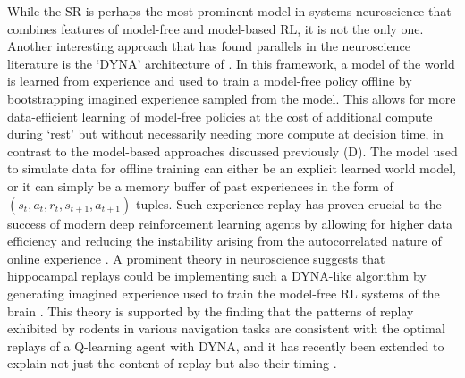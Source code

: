 While the SR is perhaps the most prominent model in systems neuroscience that combines features of model-free and model-based RL, it is not the only one.
Another interesting approach that has found parallels in the neuroscience literature is the `DYNA' architecture of \citet{sutton1991dyna}.
In this framework, a model of the world is learned from experience and used to train a model-free policy offline by bootstrapping imagined experience sampled from the model.
This allows for more data-efficient learning of model-free policies at the cost of additional compute during `rest' but without necessarily needing more compute at decision time, in contrast to the model-based approaches discussed previously (D).
The model used to simulate data for offline training can either be an explicit learned world model, or it can simply be a memory buffer of past experiences in the form of $(s_t, a_t, r_t, s_{t+1}, a_{t+1})$ tuples.
Such experience replay has proven crucial to the success of modern deep reinforcement learning agents by allowing for higher data efficiency and reducing the instability arising from the autocorrelated nature of online experience \citep{mnih2013playing,schaul2015prioritized}.
A prominent theory in neuroscience suggests that hippocampal replays could be implementing such a DYNA-like algorithm by generating imagined experience used to train the model-free RL systems of the brain \citep{mattar2018prioritized}.
This theory is supported by the finding that the patterns of replay exhibited by rodents in various navigation tasks are consistent with the optimal replays of a Q-learning agent with DYNA, and it has recently been extended to explain not just the content of replay but also their timing \citep{agrawal2022temporal}.
